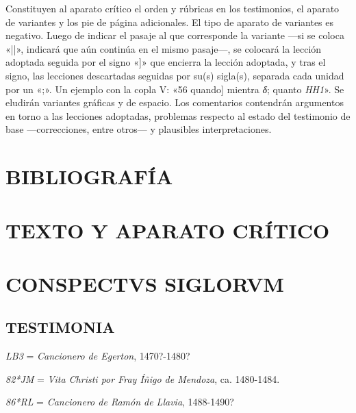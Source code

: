 \documentclass[11pt,a4paper,twoside]{article}
\newcommand{\comillas}[1]{«#1»}
\begin{document}
Constituyen al aparato crítico el orden y rúbricas en los testimonios, el aparato de variantes y los pie de página adicionales. El tipo de aparato de variantes es negativo. Luego de indicar el pasaje al que corresponde la variante —si se coloca \comillas{||}, indicará que aún continúa en el mismo pasaje—, se colocará la lección adoptada seguida por el signo \comillas{]} que encierra la lección adoptada, y tras el signo, las lecciones descartadas seguidas por su(s) sigla(s), separada cada unidad por un \comillas{;}. Un ejemplo con la copla V: \comillas{56 quando] mientra \textit{δ}; quanto \textit{HH1}}. Se eludirán variantes gráficas y de espacio. Los comentarios contendrán argumentos en torno a las lecciones adoptadas, problemas respecto al estado del testimonio de base —correcciones, entre otros— y plausibles interpretaciones.

\section*{{\fontsize{13}{14.35}\selectfont BIBLIOGRAFÍA}}
\nocite{*}
\printbibliography[heading=none]
\newpage

\section*{\raggedleft \fontsize{13}{14.35}\selectfont TEXTO Y APARATO CRÍTICO}
\newpage

\section*{{\fontsize{13}{14.35}\selectfont CONSPECTVS SIGLORVM}}

\subsection*{{\fontsize{11}{11.96}\selectfont TESTIMONIA}}

\textit{LB3} = \textit{Cancionero de Egerton}, 1470?-1480?

\textit{82*JM} = \textit{Vita Christi por Fray Íñigo de Mendoza}, ca. 1480-1484.

\textit{86*RL} = \textit{Cancionero de Ramón de Llavia}, 1488-1490?
\end{document}
